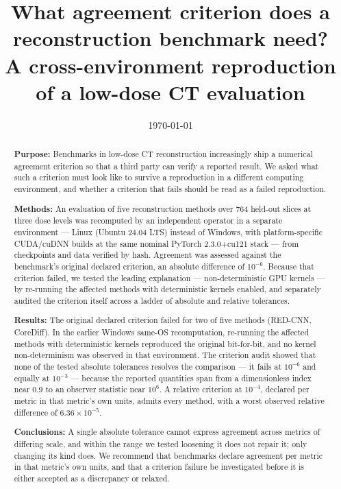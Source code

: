\documentclass[11pt]{article}
\title{\textbf{What agreement criterion does a reconstruction benchmark need?\\
A cross-environment reproduction of a low-dose CT evaluation}}
\author{\todo{author list, affiliations, ORCIDs, corresponding author}}
\date{\today}
\begin{document}
\maketitle

\begin{abstract}
\noindent\textbf{Purpose:} Benchmarks in low-dose CT reconstruction increasingly ship a numerical
agreement criterion so that a third party can verify a reported result. We asked what such a
criterion must look like to survive a reproduction in a different computing environment, and whether
a criterion that fails should be read as a failed reproduction.

\noindent\textbf{Methods:} An evaluation of five reconstruction methods over 764 held-out slices at
three dose levels was recomputed by an independent operator in a separate environment --- Linux
(Ubuntu 24.04 LTS) instead of Windows, with platform-specific CUDA/cuDNN builds at the same
nominal PyTorch 2.3.0+cu121 stack --- from checkpoints and data
verified by hash. Agreement was assessed against the benchmark's original declared criterion, an
absolute difference of $10^{-6}$. Because that criterion failed, we tested the leading explanation
--- non-deterministic GPU kernels --- by re-running the affected methods with deterministic kernels
enabled, and separately audited the criterion itself across a ladder of absolute and relative
tolerances.

\noindent\textbf{Results:} The original declared criterion failed for two of five methods
(RED-CNN, CoreDiff). In the earlier Windows same-OS recomputation, re-running the affected methods
with deterministic kernels reproduced the original bit-for-bit, and no kernel non-determinism was
observed in that environment. The criterion audit showed that none of
the tested absolute tolerances resolves the comparison --- it fails at $10^{-6}$ and equally at
$10^{-3}$ --- because the reported quantities span from a
dimensionless index near 0.9 to an observer statistic near $10^{6}$. A relative criterion at
$10^{-4}$, declared per metric in that metric's own units, admits every method, with a worst
observed relative difference of $6.36\times10^{-5}$.

\noindent\textbf{Conclusions:} A single absolute tolerance cannot express agreement across metrics of
differing scale, and within the range we tested loosening it does not repair it; only changing its
kind does. We recommend that
benchmarks declare agreement per metric in that metric's own units, and that a criterion failure be
investigated before it is either accepted as a discrepancy or relaxed.
\end{abstract}
\end{document}
